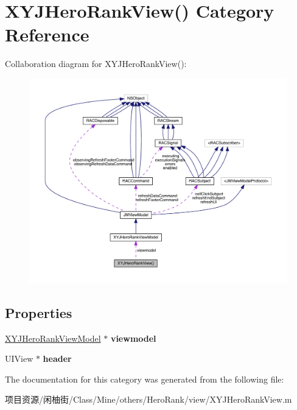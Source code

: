 \hypertarget{category_x_y_j_hero_rank_view_07_08}{}\section{X\+Y\+J\+Hero\+Rank\+View() Category Reference}
\label{category_x_y_j_hero_rank_view_07_08}


Collaboration diagram for X\+Y\+J\+Hero\+Rank\+View()\+:\nopagebreak
\begin{figure}[H]
\begin{center}
\leavevmode
\includegraphics[width=350pt]{category_x_y_j_hero_rank_view_07_08__coll__graph}
\end{center}
\end{figure}
\subsection*{Properties}
\begin{DoxyCompactItemize}
\item 
\mbox{\label{category_x_y_j_hero_rank_view_07_08_a4fb1ed61364e212e34cc727eb10c87dc}} 
\mbox{\hyperlink{interface_x_y_j_hero_rank_view_model}{X\+Y\+J\+Hero\+Rank\+View\+Model}} $\ast$ {\bfseries viewmodel}
\item 
\mbox{\label{category_x_y_j_hero_rank_view_07_08_aeea194f20b7cdb5f645737479c09456c}} 
U\+I\+View $\ast$ {\bfseries header}
\end{DoxyCompactItemize}


The documentation for this category was generated from the following file\+:\begin{DoxyCompactItemize}
\item 
项目资源/闲柚街/\+Class/\+Mine/others/\+Hero\+Rank/view/X\+Y\+J\+Hero\+Rank\+View.\+m\end{DoxyCompactItemize}
